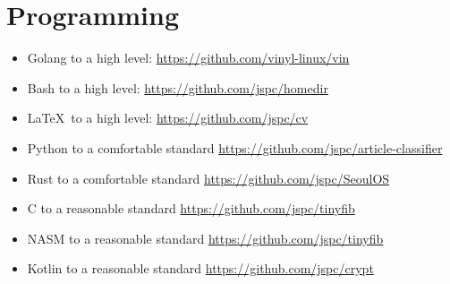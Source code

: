 \section{Programming}

\begin{itemize}
\item Golang to a high level: \href{https://github.com/vinyl-linux/vin}{https://github.com/vinyl-linux/vin}
\item Bash to a high level: \href{https://github.com/jspc/homedir}{https://github.com/jspc/homedir}
\item \LaTeX \ to a high level: \href{https://github.com/jspc/cv}{https://github.com/jspc/cv}
\item Python to a comfortable standard \href{https://github.com/jspc/article-classifier}{https://github.com/jspc/article-classifier}
\item Rust to a comfortable standard \href{https://github.com/jspc/SeoulOS}{https://github.com/jspc/SeoulOS}
\item C to a reasonable standard \href{https://github.com/jspc/tinyfib}{https://github.com/jspc/tinyfib}
\item NASM to a reasonable standard \href{https://github.com/jspc/tinyfib}{https://github.com/jspc/tinyfib}
\item Kotlin to a reasonable standard \href{https://github.com/jspc/crypt}{https://github.com/jspc/crypt}
\end{itemize}
